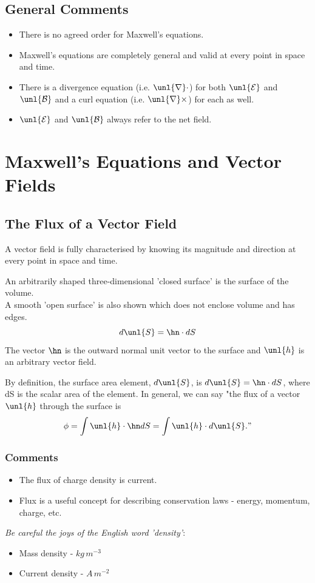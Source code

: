 \documentclass[a4paper, 11pt, normalem]{report}
\renewcommand\E{\mathcal{E}}
\newcommand\uE{\unl{\E}}
\renewcommand\B{\mathcal{B}}
\newcommand\uB{\unl{\B}}
\renewcommand\del{\unl{\nabla}}
\begin{document}
\subsection{General Comments}
\begin{itemize}
    \item There is no agreed order for Maxwell's equations.
    \item Maxwell's equations are completely general and valid at every point in space and time.
    \item There is a divergence equation (i.e. $\del \cdot$) for both $\uE$ and $\uB$ and a curl equation (i.e. $\del \times$) for each as well.
    \item $\uE$ and $\uB$ always refer to the net field.
\end{itemize}

\section{Maxwell's Equations and Vector Fields}
\subsection{The Flux of a Vector Field}
A vector field is fully characterised by knowing its magnitude and direction at every point in space and time.

An arbitrarily shaped three-dimensional 'closed surface' is the surface of the volume. \\
A smooth 'open surface' is also shown which does not enclose volume and has edges.
\begin{equation}
    d\unl{S} = \hn \cdot dS
\end{equation}
The vector $\hn$ is the outward normal unit vector to the surface and $\unl{h}$ is an arbitrary vector field.

By definition, the surface area element, $d\unl{S}$, is $d\unl{S} = \hn \cdot dS$, where dS is the scalar area of the element.
In general, we can say "the flux of a vector $\unl{h}$ through the surface is
\begin{equation}
    \phi = \int \unl{h} \cdot \hn dS = \int \unl{h} \cdot d\unl{S}."
\end{equation}

\subsubsection{Comments}
\begin{itemize}
    \item The flux of charge density is current.
    \item Flux is a useful concept for describing conservation laws - energy, momentum, charge, etc.
\end{itemize}
\emph{Be careful the joys of the English word 'density'}:
\begin{itemize}
    \item Mass density - $kg\,m^{-3}$
    \item Current density - $A\,m^{-2}$
\end{itemize}
\end{document}
